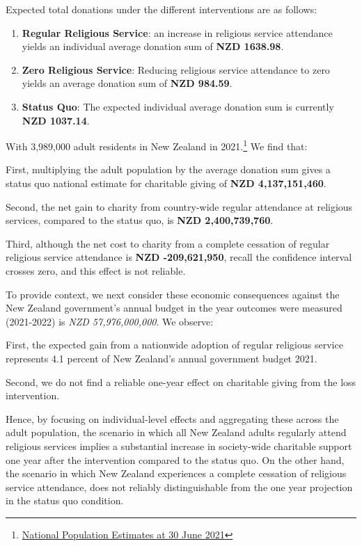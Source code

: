 \documentclass[
  single column]{article}
\providecommand{\tightlist}{%
  \setlength{\itemsep}{0pt}\setlength{\parskip}{0pt}}\usepackage{longtable,booktabs,array}
\begin{document}
Expected total donations under the different interventions are as
follows:

\begin{enumerate}
\def\labelenumi{\arabic{enumi}.}
\tightlist
\item
  \textbf{Regular Religious Service}: an increase in religious service
  attendance yields an individual average donation sum of \textbf{NZD
  1638.98}.
\item
  \textbf{Zero Religious Service}: Reducing religious service attendance
  to zero yields an average donation sum of \textbf{NZD 984.59}.
\item
  \textbf{Status Quo}: The expected individual average donation sum is
  currently \textbf{NZD 1037.14}.
\end{enumerate}

With 3,989,000 adult residents in New Zealand in 2021.\footnote{\href{https://www.stats.govt.nz/information-releases/national-population-estimates-at-30-june-2021}{National
  Population Estimates at 30 June 2021}} We find that:

First, multiplying the adult population by the average donation sum
gives a status quo national estimate for charitable giving of
\textbf{NZD 4,137,151,460}.

Second, the net gain to charity from country-wide regular attendance at
religious services, compared to the status quo, is \textbf{NZD
2,400,739,760}.

Third, although the net cost to charity from a complete cessation of
regular religious service attendance is \textbf{NZD -209,621,950},
recall the confidence interval crosses zero, and this effect is not
reliable.

To provide context, we next consider these economic consequences against
the New Zealand government's annual budget in the year outcomes were
measured (2021-2022) is \emph{NZD 57,976,000,000}. We observe:

First, the expected gain from a nationwide adoption of regular religious
service represents 4.1 percent of New Zealand's annual government budget
2021.

Second, we do not find a reliable one-year effect on charitable giving
from the loss intervention.

Hence, by focusing on individual-level effects and aggregating these
across the adult population, the scenario in which all New Zealand
adults regularly attend religious services implies a substantial
increase in society-wide charitable support one year after the
intervention compared to the status quo. On the other hand, the scenario
in which New Zealand experiences a complete cessation of religious
service attendance, does not reliably distinguishable from the one year
projection in the status quo condition.
\end{document}
